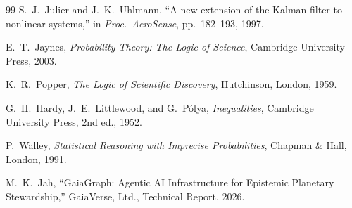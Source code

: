 \documentclass[12pt]{article}
\begin{document}
\begin{thebibliography}{99}
 S.\ J.\ Julier and J.\ K.\ Uhlmann, ``A new extension of the Kalman filter to nonlinear systems,'' in \textit{Proc.\ AeroSense}, pp.\ 182--193, 1997.

 E.\ T.\ Jaynes, \textit{Probability Theory: The Logic of Science}, Cambridge University Press, 2003.

 K.\ R.\ Popper, \textit{The Logic of Scientific Discovery}, Hutchinson, London, 1959.

 G.\ H.\ Hardy, J.\ E.\ Littlewood, and G.\ P\'{o}lya, \textit{Inequalities}, Cambridge University Press, 2nd ed., 1952.

 P.\ Walley, \textit{Statistical Reasoning with Imprecise Probabilities}, Chapman \& Hall, London, 1991.

 M.\ K.\ Jah, ``GaiaGraph: Agentic AI Infrastructure for Epistemic Planetary Stewardship,'' GaiaVerse, Ltd., Technical Report, 2026.

\end{thebibliography}
\end{document}
